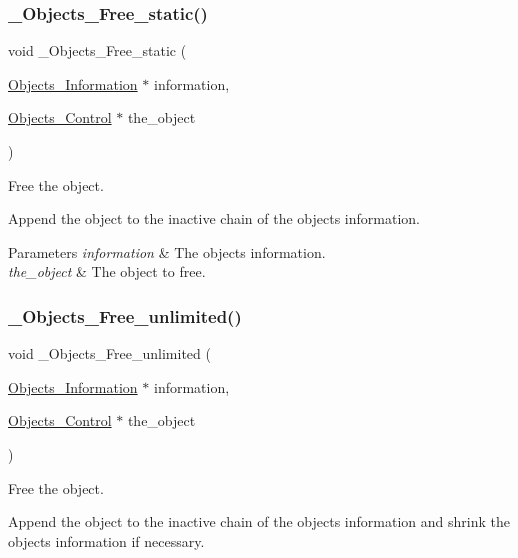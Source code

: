 \subsubsection{\texorpdfstring{\_Objects\_Free\_static()}{\_Objects\_Free\_static()}}
{\footnotesize\ttfamily void \+\_\+\+Objects\+\_\+\+Free\+\_\+static (\begin{DoxyParamCaption}\item[{\mbox{\hyperlink{structObjects__Information}{Objects\+\_\+\+Information}} $\ast$}]{information,  }\item[{\mbox{\hyperlink{structObjects__Control}{Objects\+\_\+\+Control}} $\ast$}]{the\+\_\+object }\end{DoxyParamCaption})}



Free the object. 

Append the object to the inactive chain of the objects information.


\begin{DoxyParams}{Parameters}
{\em information} & The objects information. \\
\hline
{\em the\+\_\+object} & The object to free. \\
\hline
\end{DoxyParams}
\mbox{\label{group__RTEMSScoreObject_gae07a394b03c4cb77414045f2fca32e62}} 
\subsubsection{\texorpdfstring{\_Objects\_Free\_unlimited()}{\_Objects\_Free\_unlimited()}}
{\footnotesize\ttfamily void \+\_\+\+Objects\+\_\+\+Free\+\_\+unlimited (\begin{DoxyParamCaption}\item[{\mbox{\hyperlink{structObjects__Information}{Objects\+\_\+\+Information}} $\ast$}]{information,  }\item[{\mbox{\hyperlink{structObjects__Control}{Objects\+\_\+\+Control}} $\ast$}]{the\+\_\+object }\end{DoxyParamCaption})}



Free the object. 

Append the object to the inactive chain of the objects information and shrink the objects information if necessary.


